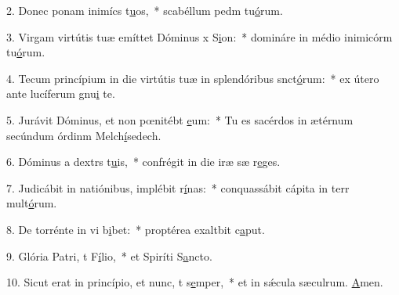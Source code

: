 2. Donec ponam inimícs t\uline{u}os,~* scabéllum pedm tu\uline{ó}rum.\par 
3. Virgam virtútis tuæ emíttet Dóminus x S\uline{i}on:~* domináre in médio inimicórm tu\uline{ó}rum.\par 
4. Tecum princípium in die virtútis tuæ in splendóribus snct\uline{ó}rum:~* ex útero ante lucíferum gnu\uline{i} te.\par 
5. Jurávit Dóminus, et non pœnitébt \uline{e}um:~* Tu es sacérdos in ætérnum secúndum órdinm Melch\uline{í}sedech.\par 
6. Dóminus a dextrs t\uline{u}is,~* confrégit in die iræ sæ r\uline{e}ges.\par 
7. Judicábit in natiónibus, implébit r\uline{í}nas:~* conquassábit cápita in terr mult\uline{ó}rum.\par 
8. De torrénte in vi b\uline{i}bet:~* proptérea exaltbit c\uline{a}put.\par 
9. Glória Patri, t F\uline{í}lio,~* et Spiríti S\uline{a}ncto.\par 
10. Sicut erat in princípio, et nunc, t s\uline{e}mper,~* et in sǽcula sæculrum. \uline{A}men.\par 
